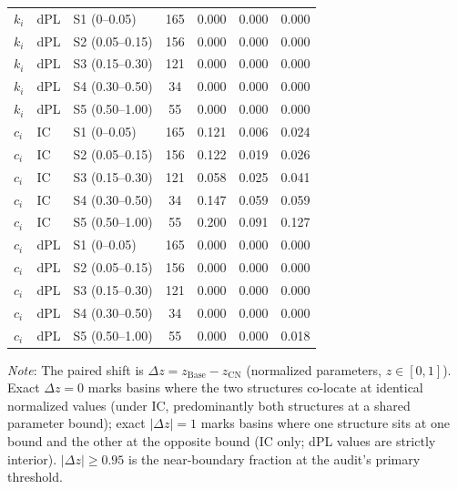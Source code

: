 \begin{table}[t]
\begin{threeparttable}
\begin{tabular}{lllcccc}
$k_i$ & dPL & S1 (0–0.05) & 165 & 0.000 & 0.000 & 0.000 \\
$k_i$ & dPL & S2 (0.05–0.15) & 156 & 0.000 & 0.000 & 0.000 \\
$k_i$ & dPL & S3 (0.15–0.30) & 121 & 0.000 & 0.000 & 0.000 \\
$k_i$ & dPL & S4 (0.30–0.50) & 34 & 0.000 & 0.000 & 0.000 \\
$k_i$ & dPL & S5 (0.50–1.00) & 55 & 0.000 & 0.000 & 0.000 \\
$c_i$ & IC & S1 (0–0.05) & 165 & 0.121 & 0.006 & 0.024 \\
$c_i$ & IC & S2 (0.05–0.15) & 156 & 0.122 & 0.019 & 0.026 \\
$c_i$ & IC & S3 (0.15–0.30) & 121 & 0.058 & 0.025 & 0.041 \\
$c_i$ & IC & S4 (0.30–0.50) & 34 & 0.147 & 0.059 & 0.059 \\
$c_i$ & IC & S5 (0.50–1.00) & 55 & 0.200 & 0.091 & 0.127 \\
$c_i$ & dPL & S1 (0–0.05) & 165 & 0.000 & 0.000 & 0.000 \\
$c_i$ & dPL & S2 (0.05–0.15) & 156 & 0.000 & 0.000 & 0.000 \\
$c_i$ & dPL & S3 (0.15–0.30) & 121 & 0.000 & 0.000 & 0.000 \\
$c_i$ & dPL & S4 (0.30–0.50) & 34 & 0.000 & 0.000 & 0.000 \\
$c_i$ & dPL & S5 (0.50–1.00) & 55 & 0.000 & 0.000 & 0.018 \\
\bottomrule
\end{tabular}
\begin{tablenotes}[flushleft]
\small
\item \textit{Note}: The paired shift is $\Delta z = z_{\mathrm{Base}} - z_{\mathrm{CN}}$ (normalized parameters, $z \in [0,1]$). Exact $\Delta z = 0$ marks basins where the two structures co-locate at identical normalized values (under IC, predominantly both structures at a shared parameter bound); exact $|\Delta z| = 1$ marks basins where one structure sits at one bound and the other at the opposite bound (IC only; dPL values are strictly interior). $|\Delta z| \ge 0.95$ is the near-boundary fraction at the audit's primary threshold.
\end{tablenotes}
\end{threeparttable}
\end{table}
